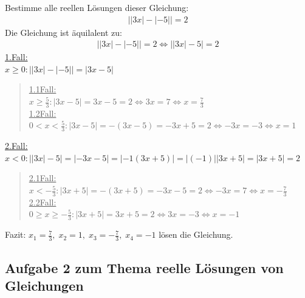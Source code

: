 Bestimme alle reellen Lösungen dieser Gleichung:\\
\begin{align*}
	\big||3x|-|-5|\big|=2
\end{align*}
Die Gleichung ist äquilalent zu:\\
\begin{align*}
	\big||3x|-|-5|\big|=2\Leftrightarrow\big||3x|-5\big|=2
\end{align*}
\newpage
\noindent
\underline{1.Fall:}\\
$ x\geq 0:\big||3x|-|-5|\big|=|3x-5| $ \\
\begin{quote}
	\underline{1.1Fall:}\\
	$x\geq \frac{5}{3}:|3x-5|=3x-5=2\Leftrightarrow 3x=7\Leftrightarrow x=\frac{7}{3}$\\
	\underline{1.2Fall:}\\
	$0<x<\frac{5}{3}:|3x-5|=-(3x-5)=-3x+5=2\Leftrightarrow -3x=-3\Leftrightarrow x=1$\\
\end{quote}
\underline{2.Fall:}\\
$x<0:\big||3x|-5\big|=|-3x-5|=|-1(3x+5)|=|(-1)||3x+5|=|3x+5|=2$\\
\begin{quote}
	\underline{2.1Fall:}\\
	$x<-\frac{5}{3}:|3x+5|=-(3x+5) =-3x-5=2\Leftrightarrow-3x=7\Leftrightarrow x=-\frac{7}{3} $\\
	\underline{2.2Fall:}\\
	$0\geq x\geq -\frac{5}{3} : |3x+5|=3x+5=2\Leftrightarrow 3x=-3\Leftrightarrow x=-1 $\\
\end{quote}
Fazit: $x_1=\frac{7}{3},\; x_2=1,\; x_3=-\frac{7}{3},\; x_4=-1$ lösen die Gleichung.\\

\subsection{Aufgabe 2 zum Thema reelle Lösungen von Gleichungen}

